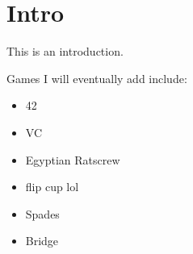 \section{Intro}

This is an introduction.

Games I will eventually add include:

\begin{itemize}
    \item 42
    \item VC
    \item Egyptian Ratscrew
    \item flip cup lol
    \item Spades
    \item Bridge
\end{itemize}
